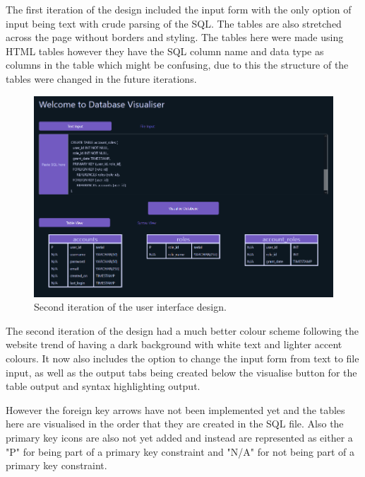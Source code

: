 The first iteration of the design included the input form with the only option of input being text with crude parsing of the SQL. The tables are also stretched across the page without borders and styling. The tables here were made using HTML tables however they have the SQL column name and data type as columns in the table which might be confusing, due to this the structure of the tables were changed in the future iterations.

\newpage

\begin{figure}[h!]
	\centering
	\includegraphics[width=\textwidth]{secondDesign}
	\caption{Second iteration of the user interface design.}
	\label{fig:secondDesign}
\end{figure}

The second iteration of the design had a much better colour scheme following the website trend of having a dark background with white text and lighter accent colours. It now also includes the option to change the input form from text to file input, as well as the output tabs being created below the visualise button for the table output and syntax highlighting output. 

However the foreign key arrows have not been implemented yet and the tables here are visualised in the order that they are created in the SQL file. Also the primary key icons are also not yet added and instead are represented as either a "P" for being part of a primary key constraint and "N/A" for not being part of a primary key constraint.

\newpage

